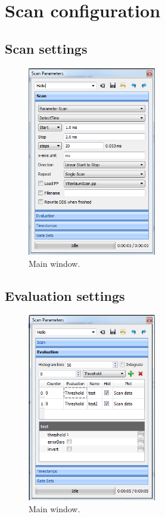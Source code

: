 \documentclass{scrartcl}
\begin{document}
\section{Scan configuration}
\subsection{Scan settings}
\begin{figure}[htbp]
\begin{center}
\includegraphics[width=0.5\textwidth]{ScanParametersScan}
\end{center}
\caption{\label{PulseProgram} Main window.}
\end{figure}

\subsection{Evaluation settings}
\begin{figure}[htbp]
\begin{center}
\includegraphics[width=0.5\textwidth]{ScanParametersEvaluation}
\end{center}
\caption{\label{PulseProgram} Main window.}
\end{figure}
\end{document}
